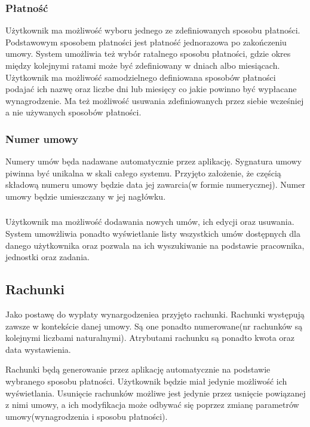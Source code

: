 \subsubsection{Płatność}
Użytkownik ma możliwość wyboru jednego ze zdefiniowanych sposobu płatności. Podstawowym sposobem płatności jest płatność jednorazowa po zakończeniu umowy. System umożliwia też wybór ratalnego sposobu płatności, gdzie okres między kolejnymi ratami może być zdefiniowany w dniach albo miesiącach. Użytkownik ma możliwość samodzielnego definiowana sposobów płatności podajać ich nazwę oraz liczbe dni lub miesięcy co jakie powinno być wypłacane wynagrodzenie. Ma też możliwość usuwania zdefiniowanych przez siebie wcześniej a nie używanych sposobów płatności. 

\subsubsection{Numer umowy}
Numery umów będa nadawane automatycznie przez aplikację. Sygnatura umowy piwinna być unikalna w skali całego systemu. Przyjęto założenie, że częścią składową numeru umowy będzie data jej zawarcia(w formie numerycznej). Numer umowy będzie umieszczany w jej nagłówku.

\subsubsection{}
Użytkownik ma możliwość dodawania nowych umów, ich edycji oraz usuwania. System umowżliwia ponadto wyświetlanie listy wszystkich umów dostępnych dla danego użytkownika oraz pozwala na ich wyszukiwanie na podstawie pracownika, jednostki oraz zadania.

\subsection[Rachunki][Rachunki]{Rachunki}
Jako postawę do wypłaty wynargodzeniea przyjęto rachunki. Rachunki występują zawsze w kontekście danej umowy. Są one ponadto numerowane(nr rachunków są kolejnymi liczbami naturalnymi). Atrybutami rachunku są ponadto kwota oraz data wystawienia.

Rachunki będą generowanie przez aplikację automatycznie na podstawie wybranego sposobu płatności. Użytkownik będzie miał jedynie możliwość ich wyświetlania. Usunięcie rachunków możliwe jest jedynie przez usnięcie powiązanej z nimi umowy, a ich modyfikacja może odbywać się poprzez zmianę parametrów umowy(wynagrodzenia i sposobu płatności).


